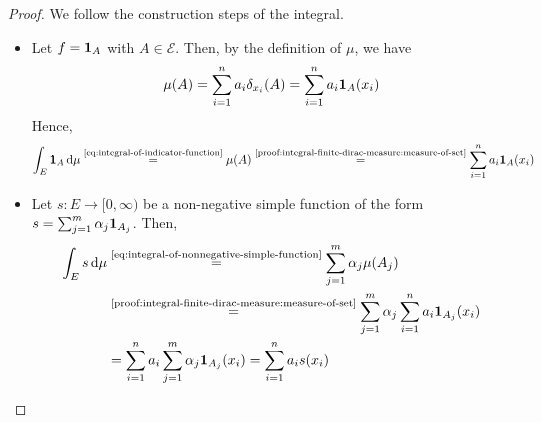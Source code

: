\begin{proof}
We follow the construction steps of the integral.
\begin{itemize}[leftmargin=2.0em, labelsep=.5em]
  \item[\hypertarget{proofstep:integral-finite-dirac-measure-indicator-function}{\ref{step:integral-of-indicator-function}.}]
Let $f=\mathbf{1}_A$ with $A\in\mathcal{E}$.
Then, by the definition of $\mu$, we have
\begin{equation}\label{proof:integral-finite-dirac-measure:measure-of-set}
\mu(A)
=
\sum_{i=1}^n a_i\delta_{x_i}(A)
=
\sum_{i=1}^n a_i\mathbf{1}_A(x_i)
\end{equation}
Hence,
\[
\int_E \mathbf{1}_A\,\mathrm{d}\mu
\overset{\text{\eqref{eq:integral-of-indicator-function}}}{=}
\mu(A)
\overset{\text{\eqref{proof:integral-finite-dirac-measure:measure-of-set}}}{=}
\sum_{i=1}^n a_i\mathbf{1}_A(x_i)
\]

  \item[\hypertarget{proofstep:integral-finite-dirac-measure-simple-function}{\ref{step:integral-of-nonnegative-simple-function}.}]
Let $s:E\to[0,\infty)$ be a non-negative simple function of the form
\(
s
=
\sum_{j=1}^m \alpha_j\mathbf{1}_{A_j}
\).
Then,
\[
\begin{aligned}
\int_E s\,\mathrm{d}\mu
&\overset{\text{\eqref{eq:integral-of-nonnegative-simple-function}}}{=}
\sum_{j=1}^m \alpha_j\mu(A_j)
\\
&\overset{\text{\eqref{proof:integral-finite-dirac-measure:measure-of-set}}}{=}
\sum_{j=1}^m \alpha_j
\sum_{i=1}^n a_i\mathbf{1}_{A_j}(x_i)
\\
&=
\sum_{i=1}^n a_i
\sum_{j=1}^m \alpha_j\mathbf{1}_{A_j}(x_i)
=
\sum_{i=1}^n a_i s(x_i)
\end{aligned}
\]


\end{itemize}
\end{proof}
